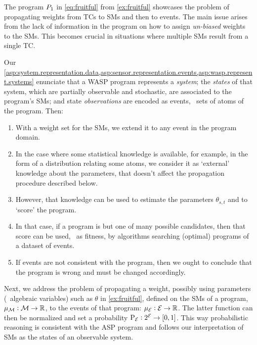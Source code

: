 \documentclass[x11names]{tlp}
\begin{document}
The program $P_{\mathrm{1}}$ in \cref{eq:fruitful} from \cref{ex:fruitful} showcases the problem of propagating weights from \aclp{TC} to \aclp{SM} and then to events.
The main issue arises from the lack of information in the program on how to assign \emph{un-biased} weights to the \aclp{SM}.
This becomes crucial in situations where multiple \aclp{SM} result from a single \acl{TC}.

Our \cref{asp:system.representation.data,asp:sensor.representation.events,asp:wasp.represent.systems} enunciate that a \ac{WASP} program represents a \emph{system}; the \emph{states} of that system, which are partially observable and stochastic, are associated to the program's \aclp{SM}; and state \emph{observations} are encoded as events, \ie\ sets of atoms of the program. 
Then:
\begin{enumerate}

	\item With a weight set for the \aclp{SM}, we extend it to any event in the program domain.

	\item In the case where some statistical knowledge is available, for example, in the form of a distribution relating some atoms, we consider it as `external' knowledge about the parameters, that doesn't affect the propagation procedure described below.

	\item However, that knowledge can be used to estimate the parameters $\theta_{s,t}$ and to `score' the program.

	\item\label{item:program.selection} In that case, if a program is but one of many possible candidates, then that score can be used, \eg\ as fitness, by algorithms searching (optimal) programs of a dataset of events.

	\item If events are not consistent with the program, then we ought to conclude that the program is wrong and must be changed accordingly.

\end{enumerate}

Next, we address the problem of propagating a weight, possibly using parameters (\ie\ algebraic variables) such as $\theta$ in \cref{ex:fruitful}, defined on the \aclp{SM} of a program, $\mu_{{\mathcal{M}}}: {\mathcal{M}} \to \mathbb{R}$, to the events of that program: $\mu_{{\mathcal{E}}}: {\mathcal{E}} \to \mathbb{R}$.
The latter function can then be normalized and set a probability $\prE:\powerset{\EVENTSset} \to \intcc{0,1}$.
This way probabilistic reasoning is consistent with the \ac{ASP} program and follows our interpretation of \aclp{SM} as the states of an observable system.
\end{document}
